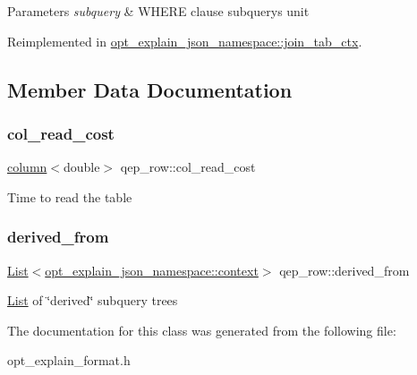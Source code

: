 \begin{DoxyParams}{Parameters}
{\em subquery} & W\+H\+E\+RE clause subquery\textquotesingle{}s unit \\
\hline
\end{DoxyParams}


Reimplemented in \mbox{\hyperlink{classopt__explain__json__namespace_1_1join__tab__ctx_acac0818845848eba4191f94df3281973}{opt\+\_\+explain\+\_\+json\+\_\+namespace\+::join\+\_\+tab\+\_\+ctx}}.



\subsection{Member Data Documentation}
\mbox{\label{classqep__row_a5be22790c0dd7c9f0e5a23f0f9455533}} 
\subsubsection{\texorpdfstring{col\+\_\+read\+\_\+cost}{col\_read\_cost}}
{\footnotesize\ttfamily \mbox{\hyperlink{structqep__row_1_1column}{column}}$<$double$>$ qep\+\_\+row\+::col\+\_\+read\+\_\+cost}

Time to read the table \mbox{\label{classqep__row_ab8d7ac6bb3668a34937ba6b7c459deb7}} 
\subsubsection{\texorpdfstring{derived\+\_\+from}{derived\_from}}
{\footnotesize\ttfamily \mbox{\hyperlink{classList}{List}}$<$\mbox{\hyperlink{classopt__explain__json__namespace_1_1context}{opt\+\_\+explain\+\_\+json\+\_\+namespace\+::context}}$>$ qep\+\_\+row\+::derived\+\_\+from}

\mbox{\hyperlink{classList}{List}} of \char`\"{}derived\char`\"{} subquery trees 

The documentation for this class was generated from the following file\+:\begin{DoxyCompactItemize}
\item 
opt\+\_\+explain\+\_\+format.\+h\end{DoxyCompactItemize}
